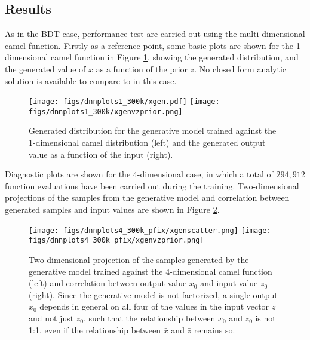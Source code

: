 \documentclass[a4paper,11pt]{article}
\begin{document}


\subsection{Results}

As in the BDT case, performance test are carried out using the multi-dimensional camel function.  Firstly as a reference point, some basic plots are shown for the 1-dimensional camel function in Figure \ref{fig:camel1d}, showing the generated distribution, and the generated value of $x$ as a function of the prior $z$.  No closed form analytic solution is available to compare to in this case.

\begin{figure}[htb!]
 \texttt{[image: figs/dnnplots1\_300k/xgen.pdf]}
 \texttt{[image: figs/dnnplots1\_300k/xgenvzprior.png]}
 \caption{Generated distribution for the generative model trained against the 1-dimensional camel distribution (left) and the generated output value as a function of the input (right).}
 \label{fig:camel1d}
\end{figure}


Diagnostic plots are shown for the 4-dimensional case, in which a total of $294,912$ function evaluations have been carried out during the training.  Two-dimensional projections of the samples from the generative model and correlation between generated samples and input values are shown in Figure \ref{fig:4dcamelgen}.

\begin{figure}[htb!]
\texttt{[image: figs/dnnplots4\_300k\_pfix/xgenscatter.png]}
\texttt{[image: figs/dnnplots4\_300k\_pfix/xgenvzprior.png]}
\caption{Two-dimensional projection of the samples generated by the generative model trained against the 4-dimensional camel function (left) and correlation between output value $x_0$ and input value $z_0$ (right).  Since the generative model is not factorized, a single output $x_0$ depends in general on all four of the values in the input vector $\bar z$ and not just $z_0$, such that the relationship between $x_0$ and $z_0$ is not 1:1, even if the relationship between $\bar x$ and $\bar z$ remains so.}
 \label{fig:4dcamelgen}
\end{figure}
\end{document}
